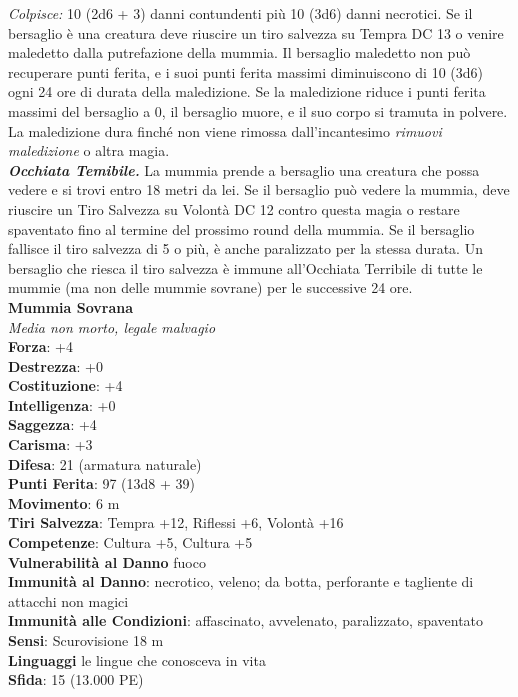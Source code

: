\begin{multicols}{2}
\emph{Colpisce:} 10 (2d6 + 3) danni contundenti più 10 (3d6) danni necrotici. Se il bersaglio è una creatura deve riuscire un tiro salvezza su Tempra DC  13 o venire maledetto dalla putrefazione della mummia. Il bersaglio maledetto non può recuperare punti ferita, e i suoi punti ferita massimi diminuiscono di 10 (3d6) ogni 24 ore di durata della maledizione. Se la maledizione riduce i punti ferita massimi del bersaglio a 0, il bersaglio muore, e il suo corpo si tramuta in polvere. La maledizione dura finché non viene rimossa dall'incantesimo \emph{rimuovi maledizione} o altra magia.\\
\emph{\textbf{Occhiata Temibile.}} La mummia prende a bersaglio una creatura che possa vedere e si trovi entro 18 metri da lei. Se il bersaglio può vedere la mummia, deve riuscire un Tiro Salvezza su Volontà DC  12 contro questa magia o restare spaventato fino al termine del prossimo round della mummia. Se il bersaglio fallisce il tiro salvezza di 5 o più, è anche paralizzato per la stessa durata. Un bersaglio che riesca il tiro salvezza è immune all'Occhiata Terribile di tutte le mummie (ma non delle mummie sovrane) per le successive 24 ore.\\

\medskip\textbf{Mummia Sovrana}\\
\emph{Media non morto, legale malvagio}\\
\textbf{Forza}: +4\\
\textbf{Destrezza}: +0\\
\textbf{Costituzione}: +4\\
\textbf{Intelligenza}: +0\\
\textbf{Saggezza}: +4\\
\textbf{Carisma}: +3\\
\textbf{Difesa}: 21 (armatura naturale)\\
\textbf{Punti Ferita}: 97 (13d8 + 39)\\
\textbf{Movimento}: 6 m\\
\textbf{Tiri Salvezza}: Tempra +12, Riflessi +6, Volontà +16\\
\textbf{Competenze}: Cultura +5, Cultura +5\\
\textbf{Vulnerabilità al Danno} fuoco\\
\textbf{Immunità al Danno}: necrotico, veleno; da botta, perforante e tagliente di attacchi non magici\\
\textbf{Immunità alle Condizioni}: affascinato, avvelenato, paralizzato, spaventato\\
\textbf{Sensi}: Scurovisione 18 m\\
\textbf{Linguaggi} le lingue che conosceva in vita\\
\textbf{Sfida}: 15 (13.000 PE)\smallskip\\


\end{multicols}
